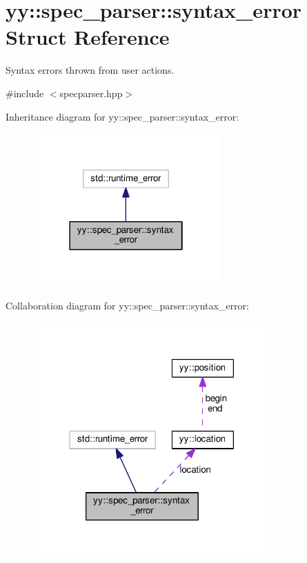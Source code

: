 \hypertarget{structyy_1_1spec__parser_1_1syntax__error}{}\section{yy\+:\+:spec\+\_\+parser\+:\+:syntax\+\_\+error Struct Reference}
\label{structyy_1_1spec__parser_1_1syntax__error}


Syntax errors thrown from user actions.  




{\ttfamily \#include $<$specparser.\+hpp$>$}



Inheritance diagram for yy\+:\+:spec\+\_\+parser\+:\+:syntax\+\_\+error\+:\nopagebreak
\begin{figure}[H]
\begin{center}
\leavevmode
\includegraphics[width=202pt]{structyy_1_1spec__parser_1_1syntax__error__inherit__graph}
\end{center}
\end{figure}


Collaboration diagram for yy\+:\+:spec\+\_\+parser\+:\+:syntax\+\_\+error\+:\nopagebreak
\begin{figure}[H]
\begin{center}
\leavevmode
\includegraphics[width=258pt]{structyy_1_1spec__parser_1_1syntax__error__coll__graph}
\end{center}
\end{figure}
